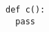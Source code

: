 \documentclass{article}
\begin{document}
\begin{verbatim}
def c():
  pass
\end{verbatim}
\end{document}
